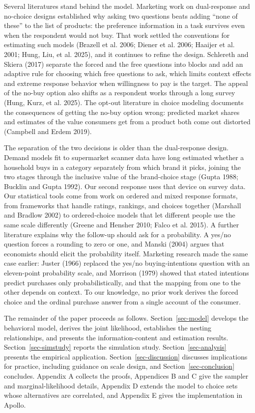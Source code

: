 \documentclass[
  letterpaper,
  DIV=11,
  numbers=noendperiod]{scrartcl}
\newcounter{none} %
\theoremstyle{plain}
\theoremstyle{plain}
\theoremstyle{remark}
\begin{document}
Several literatures stand behind the model. Marketing work on
dual-response and no-choice designs established why asking two questions
beats adding ``none of these'' to the list of products: the preference
information in a task survives even when the respondent would not buy.
That work settled the conventions for estimating such models (Brazell et
al. 2006; Diener et al. 2006; Haaijer et al. 2001; Hung, Liu, et al.
2025), and it continues to refine the design. Schlereth and Skiera
(2017) separate the forced and the free questions into blocks and add an
adaptive rule for choosing which free questions to ask, which limits
context effects and extreme response behavior when willingness to pay is
the target. The appeal of the no-buy option also shifts as a respondent
works through a long survey (Hung, Kurz, et al. 2025). The opt-out
literature in choice modeling documents the consequences of getting the
no-buy option wrong: predicted market shares and estimates of the value
consumers get from a product both come out distorted (Campbell and Erdem
2019).

The separation of the two decisions is older than the dual-response
design. Demand models fit to supermarket scanner data have long
estimated whether a household buys in a category separately from which
brand it picks, joining the two stages through the inclusive value of
the brand-choice stage (Gupta 1988; Bucklin and Gupta 1992). Our second
response uses that device on survey data. Our statistical tools come
from work on ordered and mixed response formats, from frameworks that
handle ratings, rankings, and choices together (Marshall and Bradlow
2002) to ordered-choice models that let different people use the same
scale differently (Greene and Hensher 2010; Falco et al. 2015). A
further literature explains why the follow-up should ask for a
probability. A yes/no question forces a rounding to zero or one, and
Manski (2004) argues that economists should elicit the probability
itself. Marketing research made the same case earlier: Juster (1966)
replaced the yes/no buying-intentions question with an eleven-point
probability scale, and Morrison (1979) showed that stated intentions
predict purchases only probabilistically, and that the mapping from one
to the other depends on context. To our knowledge, no prior work derives
the forced choice and the ordinal purchase answer from a single account
of the consumer.

The remainder of the paper proceeds as follows. Section~\ref{sec-model}
develops the behavioral model, derives the joint likelihood, establishes
the nesting relationships, and presents the information-content and
estimation results. Section~\ref{sec-simstudy} reports the simulation
study. Section~\ref{sec-analysis} presents the empirical application.
Section~\ref{sec-discussion} discusses implications for practice,
including guidance on scale design, and Section~\ref{sec-conclusion}
concludes. Appendix A collects the proofs, Appendices B and C give the
sampler and marginal-likelihood details, Appendix D extends the model to
choice sets whose alternatives are correlated, and Appendix E gives the
implementation in Apollo.
\end{document}
